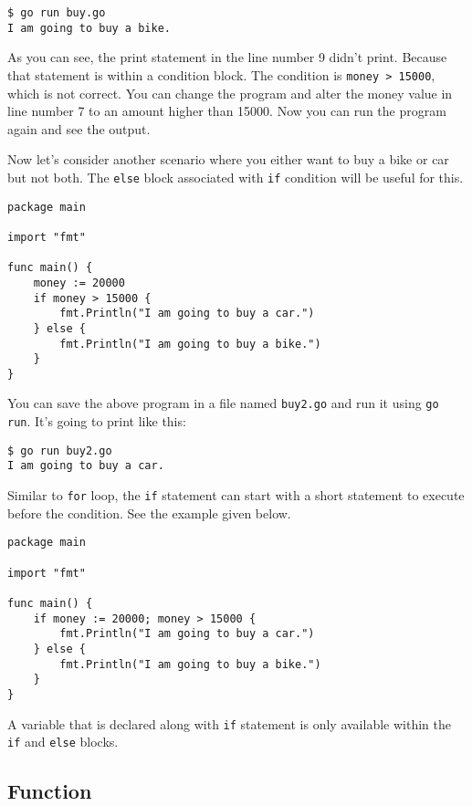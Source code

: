 \begin{lstlisting}[numbers=none]
$ go run buy.go
I am going to buy a bike.
\end{lstlisting}

As you can see, the print statement in the line number 9 didn't print.
Because that statement is within a condition block.  The condition is
\texttt{money > 15000}, which is not correct.  You can change the program and
alter the money value in line number 7 to an amount higher than 15000.
Now you can run the program again and see the output.

Now let's consider another scenario where you either want to buy a
bike or car but not both.  The \texttt{else} block associated with
\texttt{if} condition will be useful for this.

\begin{lstlisting}[caption=If with else block]
package main

import "fmt"

func main() {
    money := 20000
    if money > 15000 {
        fmt.Println("I am going to buy a car.")
    } else {
        fmt.Println("I am going to buy a bike.")
    }
}
\end{lstlisting}

You can save the above program in a file named \texttt{buy2.go} and
run it using \texttt{go run}.  It's going to print like this:

\begin{lstlisting}[numbers=none]
$ go run buy2.go
I am going to buy a car.
\end{lstlisting}

Similar to \texttt{for} loop, the \texttt{if} statement can start with
a short statement to execute before the condition.  See the example
given below.

\begin{lstlisting}[caption=If with initialization statement]
package main

import "fmt"

func main() {
    if money := 20000; money > 15000 {
        fmt.Println("I am going to buy a car.")
    } else {
        fmt.Println("I am going to buy a bike.")
    }
}
\end{lstlisting}

A variable that is declared along with \texttt{if} statement is only
available within the \texttt{if} and \texttt{else} blocks.

\subsection{Function}


